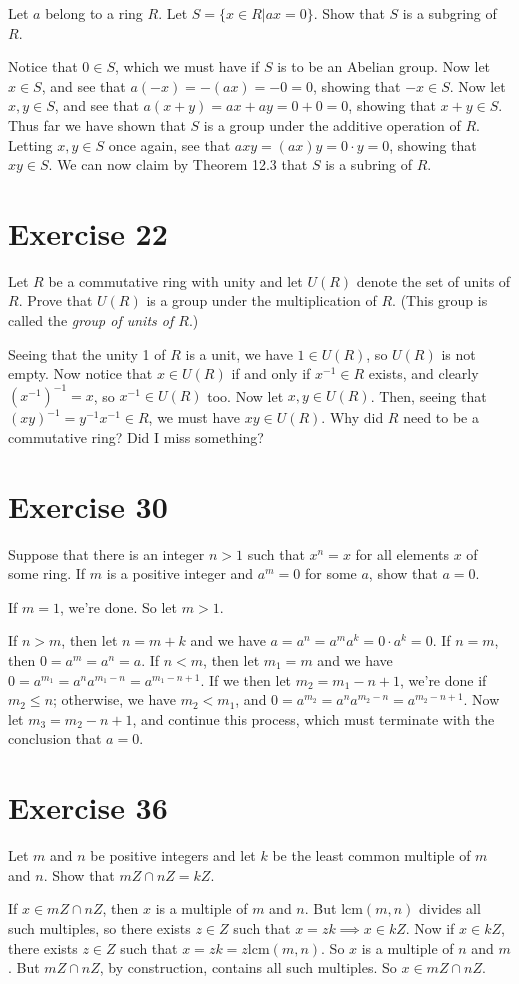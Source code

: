 \documentclass[12pt]{article}
\newcommand{\lcm}{\mbox{lcm}}
\begin{document}
Let $a$ belong to a ring $R$.  Let $S=\{x\in R|ax=0\}$.  Show that $S$ is a subgring of $R$.

Notice that $0\in S$, which we must have if $S$ is to be an Abelian group.
Now let $x\in S$, and see that $a(-x)=-(ax)=-0=0$, showing that $-x\in S$.
Now let $x,y\in S$, and see that $a(x+y)=ax+ay=0+0=0$, showing that
$x+y\in S$.  Thus far we have shown that $S$ is a group under
the additive operation of $R$.  Letting $x,y\in S$ once again,
see that $axy=(ax)y=0\cdot y=0$, showing that $xy\in S$.
We can now claim by Theorem 12.3 that $S$ is a subring of $R$.

\section*{Exercise 22}

Let $R$ be a commutative ring with unity and let $U(R)$ denote the set of
units of $R$.  Prove that $U(R)$ is a group under the multiplication of $R$.
(This group is called the {\it group of units of $R$}.)

Seeing that the unity 1 of $R$ is a unit, we have $1\in U(R)$, so $U(R)$ is not empty.
Now notice that $x\in U(R)$ if and only if $x^{-1}\in R$ exists, and clearly $(x^{-1})^{-1}=x$,
so $x^{-1}\in U(R)$ too.  Now let $x,y\in U(R)$.  Then, seeing that $(xy)^{-1}=y^{-1}x^{-1}\in R$,
we must have $xy\in U(R)$.  Why did $R$ need to be a commutative ring?  Did I miss something?

\section*{Exercise 30}

Suppose that there is an integer $n>1$ such that $x^n=x$ for all elements
$x$ of some ring.  If $m$ is a positive integer and $a^m=0$ for some $a$,
show that $a=0$.

If $m=1$, we're done.  So let $m>1$.

If $n>m$, then let $n=m+k$ and we have $a=a^n=a^ma^k=0\cdot a^k = 0$.
If $n=m$, then $0=a^m=a^n=a$.
If $n<m$, then let $m_1=m$ and we have $0=a^{m_1}=a^na^{m_1-n}=a^{m_1-n+1}$.
If we then let $m_2=m_1-n+1$, we're done if $m_2\leq n$; otherwise, we have
$m_2<m_1$, and $0=a^{m_2}=a^na^{m_2-n}=a^{m_2-n+1}$.
Now let $m_3=m_2-n+1$, and continue this process, which must terminate with
the conclusion that $a=0$.

\section*{Exercise 36}

Let $m$ and $n$ be positive integers and let $k$ be the least common multiple of $m$ and $n$.
Show that $mZ\cap nZ=kZ$.

If $x\in mZ\cap nZ$, then $x$ is a multiple of $m$ and $n$.  But $\lcm(m,n)$ divides
all such multiples, so there exists $z\in Z$ such that $x=zk\implies x\in kZ$.
Now if $x\in kZ$, there exists $z\in Z$ such that $x=zk=z\lcm(m,n)$.
So $x$ is a multiple of $n$ and $m$.  But $mZ\cap nZ$, by construction,
contains all such multiples.  So $x\in mZ\cap nZ$.
\end{document}
